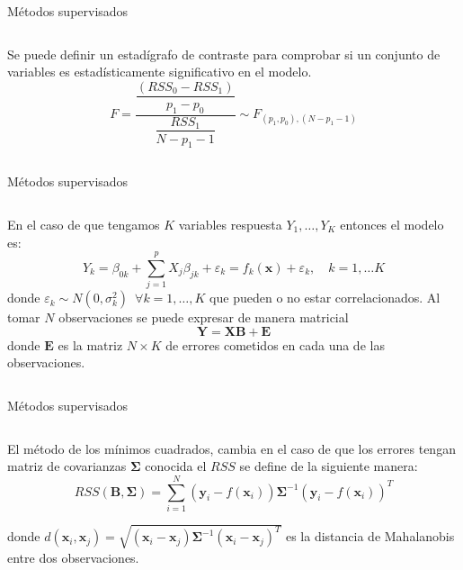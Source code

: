 \begin{frame}{Métodos supervisados}
\begin{columns}
\begin{column}{0.9\textwidth}
Se puede definir un estadígrafo de contraste para comprobar si un conjunto de variables es estadísticamente significativo en el modelo. 
\begin{equation}\label{eq: Estimador F}
F=\dfrac{\dfrac{(RSS_0-RSS_1)}{p_1-p_0}}{\dfrac{RSS_1}{N-p_1-1}}\sim F_{(p_1,p_0),(N-p_1-1)}
\end{equation}
\end{column}
\end{columns}
\end{frame}


\begin{frame}{Métodos supervisados}
\begin{columns}
\begin{column}{0.9\textwidth}
En el caso de que tengamos $K$ variables respuesta $Y_1,\ldots, Y_K$ entonces el modelo es:
\begin{equation}
Y_k=\beta_{0k}+\sum_{j=1}^p X_j\beta_{jk}+\varepsilon_k = f_k(\textbf{x})+\varepsilon_k, \quad k=1,\ldots K
\end{equation}
donde $\varepsilon_k \sim N(0,\sigma_k^2)\enspace\forall k=1,\ldots,K$ que pueden o no estar correlacionados. Al tomar $N$ observaciones se puede expresar de manera matricial
\begin{equation}
\mathbf{Y=XB+E}
\end{equation}
donde $\mathbf{E}$ es la matriz $N\times K$ de errores cometidos en cada una de las observaciones.
\end{column}
\end{columns}
\end{frame}

\begin{frame}{Métodos supervisados}
\begin{columns}
\begin{column}{0.9\textwidth}
El método de los mínimos cuadrados, cambia en el caso de que los errores tengan matriz de covarianzas $\mathbf{\Sigma}$ conocida el $RSS$ se define de la siguiente manera: 
\begin{equation}
RSS(\textbf{B},\mathbf{\Sigma})=\sum_{i=1}^N(\mathbf{y}_i-f(\textbf{x}_i)) \mathbf{\Sigma}^{-1} (\mathbf{y}_i-f(\textbf{x}_i))^T
\end{equation}

donde $d(\mathbf{x}_i,\mathbf{x}_j)=\sqrt{(\mathbf{x}_i-\mathbf{x}_j) \mathbf{\Sigma}^{-1} (\mathbf{x}_i-\mathbf{x}_j)^T}$ es la distancia de Mahalanobis entre dos observaciones. 
\end{column}
\end{columns}
\end{frame}


